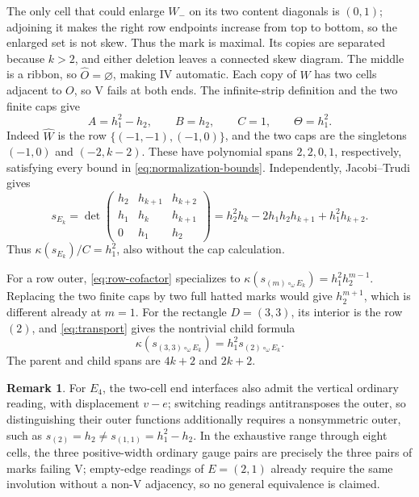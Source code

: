 \documentclass[11pt,a4paper]{amsart}
\numberwithin{equation}{section}
\theoremstyle{plain}
\theoremstyle{definition}
\newtheorem{remark}[theorem]{Remark}
\begin{document}
The only cell that could enlarge \(W_-\) on its two content diagonals is \((0,1)\); adjoining it makes the right row endpoints increase from top to bottom, so the enlarged set is not skew.  Thus the mark is maximal.  Its copies are separated because \(k>2\), and either deletion leaves a connected skew diagram.  The middle is a ribbon, so \(\widehat O=\varnothing\), making IV automatic.  Each copy of \(W\) has two cells adjacent to \(O\), so V fails at both ends.  The infinite-strip definition and the two finite caps give
\begin{equation}\label{eq:non-v-factors}
 A=h_1^2-h_2,\qquad B=h_2,\qquad C=1,\qquad\Theta=h_1^2.
\end{equation}
Indeed \(\widehat W\) is the row \(\{(-1,-1),(-1,0)\}\), and the two caps are the singletons \((-1,0)\) and \((-2,k-2)\).  These have polynomial spans \(2,2,0,1\), respectively, satisfying every bound in \eqref{eq:normalization-bounds}.  Independently, Jacobi--Trudi gives
\begin{equation}\label{eq:non-v-jt}
 s_{E_k}=\det\begin{pmatrix}
 h_2&h_{k+1}&h_{k+2}\\
 h_1&h_k&h_{k+1}\\
 0&h_1&h_2
 \end{pmatrix}
 =h_2^2h_k-2h_1h_2h_{k+1}+h_1^2h_{k+2}.
\end{equation}
Thus \(\kappa(s_{E_k})/C=h_1^2\), also without the cap calculation.

For a row outer, \eqref{eq:row-cofactor} specializes to
\(\kappa(s_{(m)\circ_\omega E_k})=h_1^2h_2^{m-1}\).
Replacing the two finite caps by two full hatted marks would give \(h_2^{m+1}\), which is different already at \(m=1\).  For the rectangle \(D=(3,3)\), its interior is the row \((2)\), and \eqref{eq:transport} gives the nontrivial child formula
\begin{equation}\label{eq:non-v-child}
 \kappa(s_{(3,3)\circ_\omega E_k})=h_1^2s_{(2)\circ_\omega E_k}.
\end{equation}
The parent and child spans are \(4k+2\) and \(2k+2\).

\begin{remark}\label{rem:ordinary-gauge}
For \(E_4\), the two-cell end interfaces also admit the vertical ordinary reading, with displacement \(v-e\); switching readings antitransposes the outer, so distinguishing their outer functions additionally requires a nonsymmetric outer, such as \(s_{(2)}=h_2\ne s_{(1,1)}=h_1^2-h_2\).  In the exhaustive range through eight cells, the three positive-width ordinary gauge pairs are precisely the three pairs of marks failing V; empty-edge readings of \(E=(2,1)\) already require the same involution without a non-V adjacency, so no general equivalence is claimed.
\end{remark}
\end{document}
